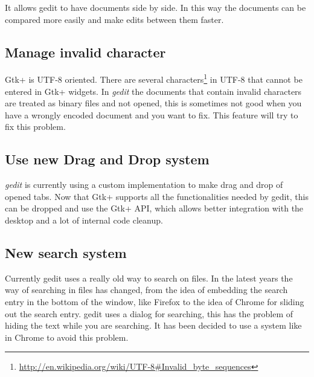 It allows gedit to have documents side by side. In this way the documents can be compared more easily and make edits between them faster.

\subsection{Manage invalid character}\label{sec:InvalidChars}

Gtk+ is UTF-8 oriented. There are several characters\footnote{\url{http://en.wikipedia.org/wiki/UTF-8\#Invalid_byte_sequences}} in UTF-8 that cannot be entered in Gtk+ widgets. In \emph{gedit} the documents that contain invalid characters are treated as binary files and not opened, this is sometimes not good when you have a wrongly encoded document and you want to fix. This feature will try to fix this problem.

\subsection{Use new Drag and Drop system}\label{sec:DND}

\emph{gedit} is currently using a custom implementation to make drag and drop of opened tabs. Now that Gtk+ supports all the functionalities needed by gedit, this can be dropped and use the Gtk+ API, which allows better integration with the desktop and a lot of internal code cleanup.

\subsection{New search system}\label{sec:SearchSystem}

Currently gedit uses a really old way to search on files. In the latest years the way of searching in files has changed, from the idea of embedding the search entry in the bottom of the window, like Firefox to the idea of Chrome for sliding out the search entry. gedit uses a dialog for searching, this has the problem of hiding the text while you are searching. It has been decided to use a system like in Chrome to avoid this problem.
